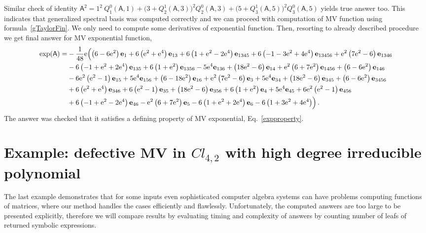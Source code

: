 \documentclass[AMA,STIX1COL]{WileyNJD-v2}
\def\m#1{\mathsf{#1}} %
\newcommand{\cl}[2]{\ensuremath{\mathit{Cl}_{#1,#2}}}
\newcommand{\ee}{\mathrm{e}} %
\def\m#1{\mathsf{#1}}%
\def\e#1{\mathbf{e}_{#1}} %
\begin{document}
\begin{eexample}
Similar check of identity $\m{A}^2=1^2\ {Q^{0}_1}(\m{A},1) + \bigl(3 + {Q^{1}_2}(\m{A},3)\bigr)^2
  {Q^{0}_2}(\m{A},3) + \bigl(5 +  {Q^{1}_3}(\m{A},5)\bigr)^2{Q^{0}_3}(\m{A},5)
$ yields true answer too. This indicates  that generalized spectral basis was computed correctly and
we can proceed with computation of MV function using formula~\eqref{gTaylorFin}.
We only need to compute some derivatives of exponential function. Then, resorting to already described procedure
we  get  final answer for MV exponential function,
\begin{align}
  \exp(\m{A})=&-\frac{1}{48} \ee \Bigl(\left(6-6 \ee^2\right) \e{1}+6 \left(\ee^2+\ee^4\right) \e{13}+6 \left(1+\ee^2-2 \ee^4\right) \e{1345}+6 \left(-1-3 \ee^2+4 \ee^4\right) \e{13456}+\ee^2 \left(7
   \ee^2-6\right) \e{1346} \notag\\
   &-6 \left(-1+\ee^2+2 \ee^4\right) \e{135}+6 \left(1+\ee^2\right) \e{1356}-5 \ee^4 \e{136}+\left(18 \ee^2-6\right) \e{14}+\ee^2 \left(6+7 \ee^2\right)
   \e{1456}+\left(6-6 \ee^2\right) \e{146}\notag\\
   &-6 \ee^2 \left(\ee^2-1\right) \e{15}+5 \ee^4 \e{156}+\left(6-18 \ee^2\right) \e{16}+\ee^2 \left(7 \ee^2-6\right) \e{3}+5 \ee^4 \e{34}+\left(18
   \ee^2-6\right) \e{345}+\left(6-6 \ee^2\right) \e{3456}\notag\\
   &+6 \left(\ee^2+\ee^4\right) \e{346}+6 \left(\ee^2-1\right) \e{35}+\left(18 \ee^2-6\right) \e{356}+6 \left(1+\ee^2\right)
   \e{4}+5 \ee^4 \e{45}+6 \ee^2 \left(\ee^2-1\right) \e{456}\notag\\
  &+6 \left(-1+\ee^2-2 \ee^4\right) \e{46}-\ee^2 \left(6+7 \ee^2\right) \e{5}-6 \left(1+\ee^2+2 \ee^4\right) \e{6}-6 \left(1+3
   \ee^2+4 \ee^4\right)\Bigr)\notag\,.
\end{align}
The answer was checked that it satisfies a defining property of MV exponential, Eq.~\eqref{expproperty}.
\end{eexample}


\section{Example: defective  MV  in \cl{4}{2} with high degree irreducible polynomial}\label{sec:exampleImplicit}
The last example demonstrates that for some inputs even sophisticated computer algebra systems can have problems computing functions of matrices, where our method handles the cases efficiently and flawlessly. Unfortunately, the computed answers are too large to be presented explicitly, therefore we will compare results by evaluating timing and complexity of answers by counting number of leafs of returned symbolic expressions.
\end{document}

